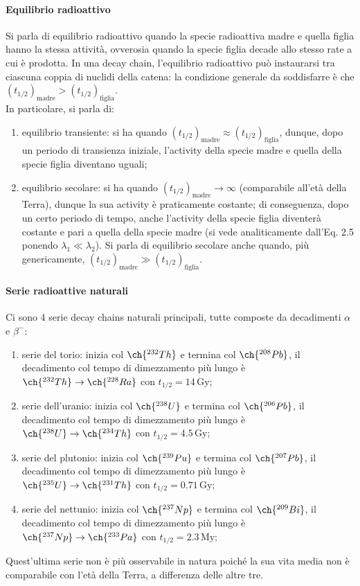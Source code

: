 \paragraph{Equilibrio radioattivo} Si parla di equilibrio radioattivo quando la specie radioattiva madre e quella figlia hanno la stessa attività, ovverosia quando la specie figlia decade allo stesso rate a cui è prodotta. In una decay chain, l'equilibrio radioattivo può instaurarsi tra ciascuna coppia di nuclidi della catena: la condizione generale da soddisfarre è che $ (t_{1/2})_{\text{madre}} > (t_{1/2})_{\text{figlia}} $.\\
In particolare, si parla di:
\begin{enumerate}
	\item equilibrio transiente: si ha quando $ (t_{1/2})_{\text{madre}} \approx (t_{1/2})_{\text{figlia}} $, dunque, dopo un periodo di transienza iniziale, l'activity della specie madre e quella della specie figlia diventano uguali;
	\item equilibrio secolare: si ha quando $ (t_{1/2})_{\text{madre}} \rightarrow \infty $ (comparabile all'età della Terra), dunque la sua activity è praticamente costante; di conseguenza, dopo un certo periodo di tempo, anche l'activity della specie figlia diventerà costante e pari a quella della specie madre (si vede analiticamente dall'Eq. 2.5 ponendo $ \lambda_1 \ll \lambda_2 $). Si parla di equilibrio secolare anche quando, più genericamente, $ (t_{1/2})_{\text{madre}} \gg (t_{1/2})_{\text{figlia}} $.
\end{enumerate}

\paragraph{Serie radioattive naturali}

Ci sono 4 serie decay chains naturali principali, tutte composte da decadimenti $ \alpha $ e $ \beta^- $:
\begin{enumerate}
  \item serie del torio: inizia col $ \ch{^{232} Th} $ e termina col $ \ch{^{208} Pb} $, il decadimento col tempo di dimezzamento più lungo è $ \ch{^{232} Th} \rightarrow \ch{^{228} Ra} $ con $ t_{1/2} = 14 \,\text{Gy} $;
  \item serie dell'uranio: inizia col $ \ch{^{238} U} $ e termina col $ \ch{^{206} Pb} $, il decadimento col tempo di dimezzamento più lungo è $ \ch{^{238} U} \rightarrow \ch{^{234} Th} $ con $ t_{1/2} = 4.5 \,\text{Gy} $;
  \item serie del plutonio: inizia col $ \ch{^{239} Pu} $ e termina col $ \ch{^{207} Pb} $, il decadimento col tempo di dimezzamento più lungo è $ \ch{^{235} U} \rightarrow \ch{^{231} Th} $ con $ t_{1/2} = 0.71 \,\text{Gy} $;
  \item serie del nettunio: inizia col $ \ch{^{237} Np} $ e termina col $ \ch{^{209} Bi} $, il decadimento col tempo di dimezzamento più lungo è $ \ch{^{237} Np} \rightarrow \ch{^{233} Pa} $ con $ t_{1/2} = 2.3 \,\text{My} $;
\end{enumerate}
Quest'ultima serie non è più osservabile in natura poiché la sua vita media non è comparabile con l'età della Terra, a differenza delle altre tre.

